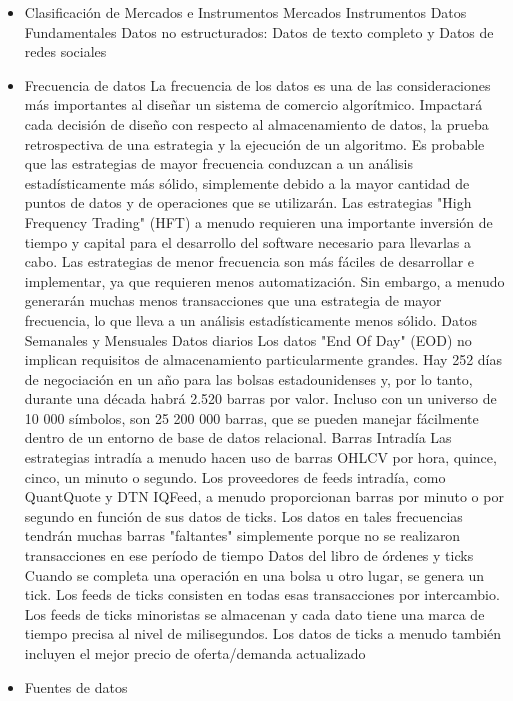 \documentclass{article}
\begin{document}
\begin{itemize}
 \item Clasificación de Mercados e Instrumentos
\subitem Mercados
\subitem Instrumentos
\subitem Datos Fundamentales
\subitem Datos no estructurados:  Datos de texto completo y Datos de redes sociales
 \item Frecuencia de datos
  La frecuencia de los datos es una de las consideraciones más importantes al diseñar un sistema de comercio algorítmico. Impactará cada decisión de diseño con respecto al almacenamiento de datos, la prueba retrospectiva de una estrategia y la ejecución de un algoritmo. Es probable que las estrategias de mayor frecuencia conduzcan a un análisis estadísticamente más sólido, simplemente debido a la mayor cantidad de puntos de datos y de operaciones que se utilizarán. Las estrategias "High Frequency Trading" (HFT)  a menudo requieren una importante inversión de tiempo y capital para el desarrollo del software necesario para llevarlas a cabo. Las estrategias de menor frecuencia son más fáciles de desarrollar e implementar, ya que requieren menos automatización. Sin embargo, a menudo generarán muchas menos transacciones que una estrategia de mayor frecuencia, lo que lleva a un análisis estadísticamente menos sólido.
\subitem Datos Semanales y Mensuales
\subitem Datos diarios
 Los datos "End Of Day" (EOD) no implican requisitos de almacenamiento particularmente grandes. Hay 252 días de negociación en un año para las bolsas estadounidenses y, por lo tanto, durante una década habrá 2.520 barras por valor. Incluso con un universo de 10 000 símbolos, son 25 200 000 barras, que se pueden manejar fácilmente dentro de un entorno de base de datos relacional.
\subitem Barras Intradía
Las estrategias intradía a menudo hacen uso de barras OHLCV por hora, quince, cinco, un minuto o segundo. Los proveedores de feeds intradía, como QuantQuote y DTN IQFeed, a menudo proporcionan barras por minuto o por segundo en función de sus datos de ticks. Los datos en tales frecuencias tendrán muchas barras "faltantes" simplemente porque no se realizaron transacciones en ese período de tiempo
\subitem Datos del libro de órdenes y ticks
Cuando se completa una operación en una bolsa u otro lugar, se genera un tick. Los feeds de ticks consisten en todas esas transacciones por intercambio. Los feeds de ticks minoristas se almacenan y cada dato tiene una marca de tiempo precisa al nivel de milisegundos. Los datos de ticks a menudo también incluyen el mejor precio de oferta/demanda actualizado
\item Fuentes de datos

\end{itemize}
\end{document}
